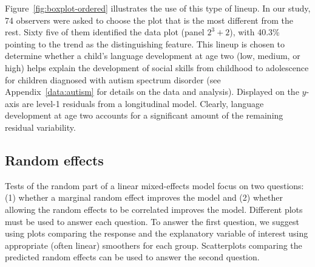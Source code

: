 \documentclass[12pt]{article} %
\begin{document}
Figure~\ref{fig:boxplot-ordered} illustrates the use of this type of lineup. In our study, 74 observers were asked to choose the plot that is the most different from the rest. Sixty five of them identified the data plot (panel $2^3 + 2$), 
with 40.3\% pointing to the trend as the distinguishing feature. 
This lineup is chosen
to determine whether a child's language development at age two (low, medium, or high) helps explain the development of social skills from childhood to adolescence for children diagnosed with autism spectrum disorder (see Appendix~\ref{data:autism} for details on the data and analysis). Displayed on the $y$-axis are level-1 residuals from a longitudinal model. Clearly, language development at age two accounts for a significant amount of the remaining residual variability.




\subsection{Random effects} 
Tests of the random part of a linear mixed-effects model focus on two questions: (1) whether a marginal random effect improves the model and (2) whether allowing the random effects to be correlated improves the model. Different plots must be used to answer each question. To answer the first question, we suggest using plots comparing the response and the explanatory variable of interest using appropriate (often linear) smoothers for each group. Scatterplots comparing the predicted random effects can be used to answer the second question.
\end{document}
